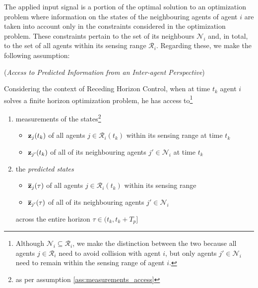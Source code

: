 The applied input signal is a portion of the optimal solution to an
optimization problem where information on the states of the neighbouring agents
of agent $i$ are taken into account only in the constraints considered in the
optimization problem. These constraints pertain to the set of its neighbours
$\mathcal{N}_i$ and, in total, to the set of all agents within its sensing
range $\mathcal{R}_i$. Regarding these, we make the following assumption:

\begin{gg_box}
  \begin{assumption} (\textit{Access to Predicted Information from an
    Inter-agent Perspective})

Considering the context of Receding Horizon Control, when
at time $t_k$ agent $i$ solves a finite horizon optimization problem, he has
access to\footnote{Although
  $\mathcal{N}_i \subseteq \mathcal{R}_i$, we make the distinction between
  the two because all agents $j \in \mathcal{R}_i$ need to avoid collision
  with agent $i$, but only agents $j' \in \mathcal{N}_i$ need to remain
  within the sensing range of agent $i$.
}

\begin{enumerate}
  \item measurements of the states\footnote{as per assumption
    \eqref{ass:measurements_access}}
    \begin{itemize}
      \item $\bm{\mathbf{z}}_j(t_k)$ of all agents $j \in \mathcal{R}_i(t_k)$ within its sensing range at time $t_k$
      \item $\bm{\mathbf{z}}_{j'}(t_k)$ of all of its neighbouring agents $j' \in \mathcal{N}_i$ at time $t_k$
      \end{itemize}
    \item the \textit{predicted states}
      \begin{itemize}
        \item $\overline{\bm{\mathbf{z}}}_j(\tau)$ of all agents $j \in \mathcal{R}_i(t_k)$ within its sensing range
        \item $\overline{\bm{\mathbf{z}}}_{j'}(\tau)$ of all of its neighbouring agents $j' \in \mathcal{N}_i$
      \end{itemize}
      across the entire horizon $\tau \in (t_k, t_k + T_p]$
\end{enumerate}
\end{assumption}
\end{gg_box}
